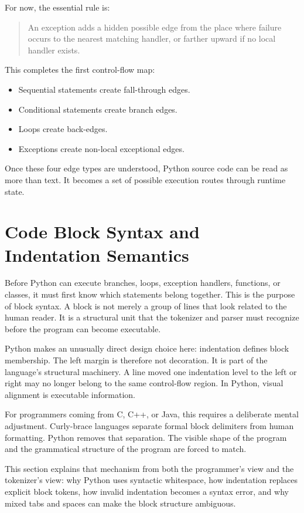 \documentclass[a4paper,twoside]{report}
\begin{document}
For now, the essential rule is:

\begin{quote}
An exception adds a hidden possible edge from the place where failure occurs to the nearest matching handler, or farther upward if no local handler exists.
\end{quote}

This completes the first control-flow map:

\begin{itemize}
    \item Sequential statements create fall-through edges.
    \item Conditional statements create branch edges.
    \item Loops create back-edges.
    \item Exceptions create non-local exceptional edges.
\end{itemize}

Once these four edge types are understood, Python source code can be read as more than text. It becomes a set of possible execution routes through runtime state.

\section{Code Block Syntax and Indentation Semantics}

Before Python can execute branches, loops, exception handlers, functions, or classes, it must first know which statements belong together. This is the purpose of block syntax. A block is not merely a group of lines that look related to the human reader. It is a structural unit that the tokenizer and parser must recognize before the program can become executable.

Python makes an unusually direct design choice here: indentation defines block membership. The left margin is therefore not decoration. It is part of the language's structural machinery. A line moved one indentation level to the left or right may no longer belong to the same control-flow region. In Python, visual alignment is executable information.

For programmers coming from C, C++, or Java, this requires a deliberate mental adjustment. Curly-brace languages separate formal block delimiters from human formatting. Python removes that separation. The visible shape of the program and the grammatical structure of the program are forced to match.

This section explains that mechanism from both the programmer's view and the tokenizer's view: why Python uses syntactic whitespace, how indentation replaces explicit block tokens, how invalid indentation becomes a syntax error, and why mixed tabs and spaces can make the block structure ambiguous.
\end{document}
